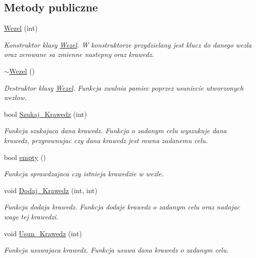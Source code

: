 \subsection*{\-Metody publiczne}
\begin{DoxyCompactItemize}
\item 
\hyperlink{class_graf_1_1_wezel_a8f37eac643fe669538f3f7150269a432}{\-Wezel} (int)
\begin{DoxyCompactList}\small\item\em \-Konstruktor klasy \hyperlink{class_graf_1_1_wezel}{\-Wezel}. \-W konstruktorze przydzielany jest klucz do danego wezla oraz zerowane sa zmienne nastepny oraz krawedz. \end{DoxyCompactList}\item 
\hyperlink{class_graf_1_1_wezel_a784050cc96ba5ea6b5d94aea3bfe7226}{$\sim$\-Wezel} ()
\begin{DoxyCompactList}\small\item\em \-Destruktor klasy \hyperlink{class_graf_1_1_wezel}{\-Wezel}. \-Funkcja zwalnia pamiec poprzez usuniecie utworzonych wezlow. \end{DoxyCompactList}\item 
bool \hyperlink{class_graf_1_1_wezel_a258afb6559f712f79192a233bc4ce8fc}{\-Szukaj\-\_\-\-Krawedz} (int)
\begin{DoxyCompactList}\small\item\em \-Funkcja szukajaca dana krawedz. \-Funkcja o zadanym celu wyszukuje dana krawedz, przyrownujac czy dana krawedz jest rowna zadanemu celu. \end{DoxyCompactList}\item 
bool \hyperlink{class_graf_1_1_wezel_acbe2d6b3cb389d24dfa02f295c870715}{empty} ()
\begin{DoxyCompactList}\small\item\em \-Funkcja sprawdzajaca czy istnieja krawedzie w wezle. \end{DoxyCompactList}\item 
void \hyperlink{class_graf_1_1_wezel_a2c1ead09b503f31130a53041b5454356}{\-Dodaj\-\_\-\-Krawedz} (int, int)
\begin{DoxyCompactList}\small\item\em \-Funkcja dodaja krawedz. \-Funkcja dodaje krawedz o zadanym celu oraz nadajac wage tej krawedzi. \end{DoxyCompactList}\item 
void \hyperlink{class_graf_1_1_wezel_a885bcf8cd789650a88ca9cc625b3ac02}{\-Usun\-\_\-\-Krawedz} (int)
\begin{DoxyCompactList}\small\item\em \-Funkcja usuwajaca krawedz. \-Funkcja usuwa dana krawedz o zadanym celu. \end{DoxyCompactList}\end{DoxyCompactItemize}

